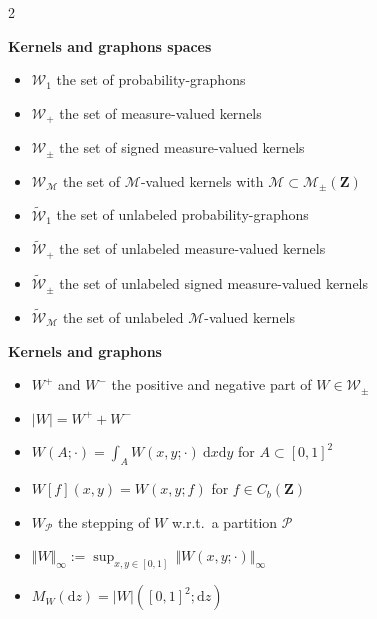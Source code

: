 \documentclass{amsart}
\newcommand{\wrt}{w.r.t.\ }
\theoremstyle{plain}
\theoremstyle{definition}
\newcommand{\Space}{\mathbf{Z}}
\newcommand{\signed}{\pm}
\newcommand{\cm}{\mathcal{M}}
\newcommand{\cM}{\mathcal{M}}
\newcommand{\cP}{\mathcal{P}}
\newcommand{\SignedMeas}{\mathcal{M}_{\pm}(\Space)}
\newcommand{\CbFunct}{C_b(\Space)}
\newcommand{\Graphon}{\mathcal{W}_1}
\newcommand{\Kernel}{\mathcal{W}_{\signed}}
\newcommand{\Kernelp}{\mathcal{W}_{+}}
\newcommand{\KernelM}{\mathcal{W}_\cm}
\newcommand{\UGraphon}{\widetilde{\mathcal{W}}_1}
\newcommand{\UKernel}{\widetilde{\mathcal{W}}_{\signed}}
\newcommand{\UKernelp}{\widetilde{\mathcal{W}}_{+}}
\newcommand{\UKernelM}{\widetilde{\mathcal{W}}_\cm}
\newcommand{\TotalMass}[1]{\norm{#1}_\infty}
\newcommand{\TM}[1]{\norm{#1}_\infty}
\newcommand{\drv}{\mathrm{d}}
\newcommand{\norm}[1]{\Vert#1\Vert}
\begin{document}
\begin{multicols}{2}
  \hrulefill
  \begin{center}
   \textbf{Kernels and graphons spaces}
\end{center}

  \begin{itemize}[leftmargin=*,itemsep=0.5em]
\item $\Graphon$ the set of probability-graphons 
\item $\Kernelp$ the set of measure-valued kernels
\item $\Kernel$ the set of signed measure-valued kernels
\item $\KernelM$ the set of $\cm$-valued kernels
	with $\cM \subset \SignedMeas$
\item $\UGraphon$ the set of unlabeled probability-graphons 
\item $\UKernelp$ the set of unlabeled measure-valued kernels
\item $\UKernel$ the set of  unlabeled signed measure-valued kernels
\item $\UKernelM$ the set of unlabeled $\cm$-valued kernels
%
\end{itemize}

 \hrulefill
  \begin{center}
   \textbf{Kernels and graphons}
\end{center}

  \begin{itemize}[leftmargin=*,itemsep=0.5em]
 \item $W^+$ and $W^-$ the positive and negative part of $W\in\Kernel$
\item $\vert W\vert = W^+ + W^-$
\item $W(A;\cdot) = \int_{A} W(x,y;\cdot)\ \drv x \drv y$ for $A\subset [0,1]^2$
\item $W[f](x,y) = W(x,y;f)$ for  $f\in\CbFunct$
\item $W_\mathcal{P}$ the stepping of $W$ \wrt a partition $\cP$%

\item $\TM{W}:=    \sup_{x,y\in [0, 1] }\, \TotalMass{W(x, y; \cdot)}$
\item $M_W(\drv z) = \vert W \vert ([0,1]^2; \drv z)$


\end{itemize}
\end{multicols}
\end{document}
